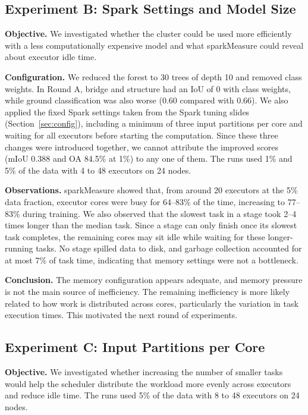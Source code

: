 \documentclass[a4paper, 11pt]{article} %
\begin{document}
\subsection{Experiment B: Spark Settings and Model Size}
\textbf{Objective.} We investigated whether the cluster could be used more efficiently with a less computationally expensive model and what sparkMeasure could reveal about executor idle time.

\textbf{Configuration.} We reduced the forest to 30 trees of depth 10 and removed class weights. In Round A, bridge and structure had an IoU of 0 with class weights, while ground classification was also worse (0.60 compared with 0.66). We also applied the fixed Spark settings taken from the Spark tuning slides (Section~\ref{sec:config}), including a minimum of three input partitions per core and waiting for all executors before starting the computation. Since these three changes were introduced together, we cannot attribute the improved scores (mIoU 0.388 and OA 84.5\% at 1\%) to any one of them. The runs used 1\% and 5\% of the data with 4 to 48 executors on 24 nodes.

\textbf{Observations.} sparkMeasure showed that, from around 20 executors at the 5\% data fraction, executor cores were busy for 64--83\% of the time, increasing to 77--83\% during training. We also observed that the slowest task in a stage took 2--4 times longer than the median task. Since a stage can only finish once its slowest task completes, the remaining cores may sit idle while waiting for these longer-running tasks. No stage spilled data to disk, and garbage collection accounted for at most 7\% of task time, indicating that memory settings were not a bottleneck.

\textbf{Conclusion.} The memory configuration appears adequate, and memory pressure is not the main source of inefficiency. The remaining inefficiency is more likely related to how work is distributed across cores, particularly the variation in task execution times. This motivated the next round of experiments.

\subsection{Experiment C: Input Partitions per Core}
\textbf{Objective.} We investigated whether increasing the number of smaller tasks would help the scheduler distribute the workload more evenly across executors and reduce idle time. The runs used 5\% of the data with 8 to 48 executors on 24 nodes.
\end{document}
